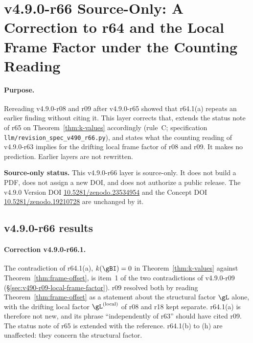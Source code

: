 \clearpage
\section*{v4.9.0-r66 Source-Only: A Correction to r64 and the Local Frame Factor under the Counting Reading}
\label{sec:v490-r66-correction-local-factor}

\paragraph{Purpose.}
Rereading v4.9.0-r08 and r09 after v4.9.0-r65 showed that r64.1(a) repeats an earlier finding without citing it.  This layer corrects that, extends the status
note of r65 on Theorem~\ref{thm:k-values} accordingly (rule~C; specification \texttt{llm/revision\_spec\_v490\_r66.py}), and states what the counting reading of
v4.9.0-r63 implies for the drifting local frame factor of r08 and r09.  It makes no prediction.  Earlier layers are not rewritten.

\noindent\textbf{Source-only status.}
This v4.9.0-r66 layer is source-only.  It does not build a PDF, does not assign a new DOI,
and does not authorize a public release.  The v4.9.0 Version DOI
\href{https://doi.org/10.5281/zenodo.23534954}{10.5281/zenodo.23534954} and the Concept DOI
\href{https://doi.org/10.5281/zenodo.19210728}{10.5281/zenodo.19210728} are unchanged by it.

\subsection*{v4.9.0-r66 results}
\label{subsec:v490-r66-results}

\paragraph{Correction v4.9.0-r66.1.}
The contradiction of r64.1(a), \(k(\gBI)=0\) in Theorem~\ref{thm:k-values} against Theorem~\ref{thm:frame-offset}, is item~1 of the two contradictions of
v4.9.0-r09 (\S\ref{sec:v490-r09-local-frame-factor}).  r09 resolved both by reading Theorem~\ref{thm:frame-offset} as a statement about the structural factor
\(\gL\) alone, with the drifting local factor \(\gL^{(\mathrm{local})}\) of r08 and r18 kept separate.  r64.1(a) is therefore not new, and its phrase ``independently of
r63'' should have cited r09.  The status note of r65 is extended with the reference.  r64.1(b) to (h) are unaffected: they concern the structural factor.

